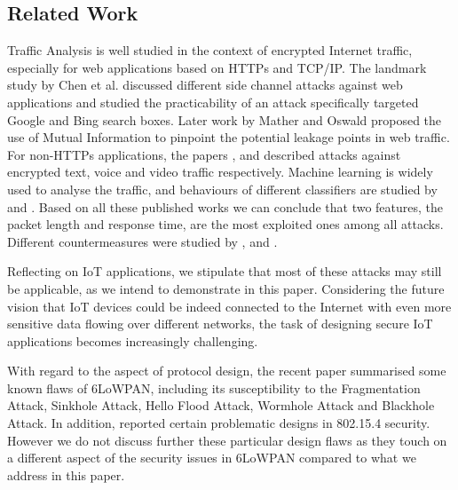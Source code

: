 \documentclass{article}
\begin{document}
\subsection{Related Work\label{subsec: RelatedWork}}

Traffic Analysis is well studied in the context of encrypted Internet traffic, especially for web applications based on HTTPs and TCP/IP. The landmark study by Chen et al. \cite{WebSidechannel} discussed different side channel attacks against web applications and \cite{SuggestBox} studied the practicability of an attack specifically targeted Google and Bing search boxes. Later work by Mather and Oswald \cite{PinpointWeb} proposed the use of Mutual Information to pinpoint the potential leakage points in web traffic. For non-HTTPs applications, the papers \cite{AppleMsg}, \cite{Language} and \cite{VideoTraffic} described attacks against encrypted text, voice and video traffic respectively. Machine learning is widely used to analyse the traffic, and behaviours of different classifiers are studied by \cite{HClassifier} and \cite{Peekaboo}. Based on all these published works we can conclude that two features, the packet length and response time, are the most exploited ones among all attacks. Different countermeasures were studied by \cite{TrafficMorphing}, \cite{HTTPOS} and \cite{FTE}.

Reflecting on IoT applications, we stipulate that most of these attacks may still be applicable, as we intend to demonstrate in this paper. Considering the future vision that IoT devices could be indeed connected to the Internet with even more sensitive data flowing over different networks, the task of designing secure IoT applications becomes increasingly challenging.

With regard to the aspect of protocol design, the recent paper \cite{6LoWPANAtk} summarised some known flaws of 6LoWPAN, including its susceptibility to the Fragmentation Attack\cite{FragAtk}, Sinkhole Attack\cite{Sinkhole}, Hello Flood Attack\cite{HelloFlood}, Wormhole Attack\cite{Wormhole} and Blackhole Attack\cite{Blackhole}. In addition, \cite{802154SecIssues} reported certain problematic designs in 802.15.4 security\cite{802154}. However we do not discuss further these particular design flaws as they touch on a different aspect of the security issues in 6LoWPAN compared to what we address in this paper.
\end{document}
